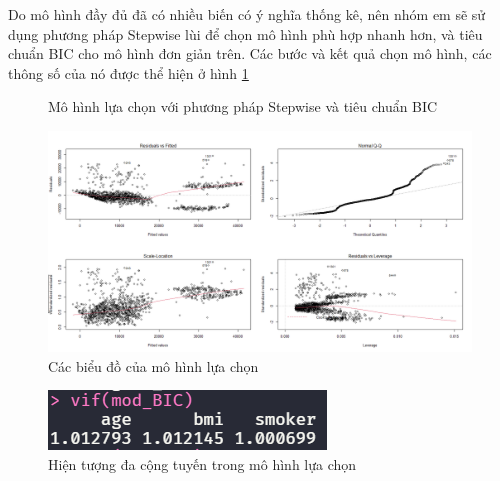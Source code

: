 Do mô hình đầy đủ đã có nhiều biến có ý nghĩa thống kê, nên nhóm em sẽ sử dụng phương pháp Stepwise lùi để chọn mô hình phù hợp nhanh hơn, và tiêu chuẩn BIC cho mô hình đơn giản trên. Các bước và kết quả chọn mô hình, các thông số của nó được thể hiện ở hình \ref{fig-a1:model-bic} 
\begin{figure}[H]
	\centering
	\hfill
	\caption{Mô hình lựa chọn với phương pháp Stepwise và tiêu chuẩn BIC}
	\label{fig-a1:model-bic}
\end{figure}


\begin{figure}[H]
	\centering
	\includegraphics[width=0.8\linewidth]{images/A1/model-bic-plot}
	\caption{Các biểu đồ của mô hình lựa chọn}
	\label{fig-a1:model-bic-plot}
\end{figure}

\begin{figure}[H]
	\centering
	\includegraphics[width=0.35\linewidth]{images/A1/model-bic-vif}
	\caption{Hiện tượng đa cộng tuyến trong mô hình lựa chọn}
	\label{fig-a1:model-bic-vif}
\end{figure}

